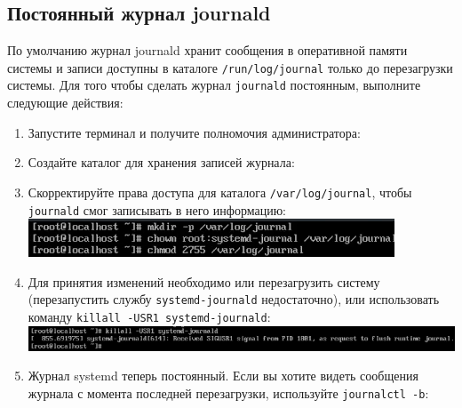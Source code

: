 \documentclass[12pt]{article}
\begin{document}
\subsection{Постоянный журнал journald}
По умолчанию журнал journald хранит сообщения в оперативной памяти системы и записи доступны в каталоге \texttt{/run/log/journal} только до перезагрузки системы. Для того чтобы сделать журнал \texttt{journald} постоянным, выполните следующие действия:
\begin{enumerate}
	\item Запустите терминал и получите полномочия администратора:
	\item Создайте каталог для хранения записей журнала:
	\item \label{access} Скорректируйте права доступа для каталога \texttt{/var/log/journal}, чтобы \texttt{journald} смог записывать в него информацию:
	      \\\includegraphics{24.png}
	\item Для принятия изменений необходимо или перезагрузить систему (перезапустить службу \texttt{systemd-journald} недостаточно), или использовать команду \texttt{killall -USR1 systemd-journald}:
	      \\\includegraphics{25.png}
	\item Журнал systemd теперь постоянный. Если вы хотите видеть сообщения журнала с момента последней перезагрузки, используйте \texttt{journalctl -b}:
\end{enumerate}
\end{document}
